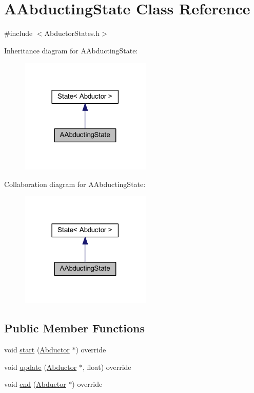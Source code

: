 \hypertarget{class_a_abducting_state}{}\section{A\+Abducting\+State Class Reference}
\label{class_a_abducting_state}


{\ttfamily \#include $<$Abductor\+States.\+h$>$}



Inheritance diagram for A\+Abducting\+State\+:
\nopagebreak
\begin{figure}[H]
\begin{center}
\leavevmode
\includegraphics[width=177pt]{class_a_abducting_state__inherit__graph}
\end{center}
\end{figure}


Collaboration diagram for A\+Abducting\+State\+:
\nopagebreak
\begin{figure}[H]
\begin{center}
\leavevmode
\includegraphics[width=177pt]{class_a_abducting_state__coll__graph}
\end{center}
\end{figure}
\subsection*{Public Member Functions}
\begin{DoxyCompactItemize}
\item 
void \hyperlink{class_a_abducting_state_a4a592efc0ae90b3c88de9cb676ed8357}{start} (\hyperlink{class_abductor}{Abductor} $\ast$) override
\item 
void \hyperlink{class_a_abducting_state_a37963b87c9c9fea8cfc8252618a53c98}{update} (\hyperlink{class_abductor}{Abductor} $\ast$, float) override
\item 
void \hyperlink{class_a_abducting_state_a618a6c11d2dc823b11161ff3a0c88ef8}{end} (\hyperlink{class_abductor}{Abductor} $\ast$) override
\end{DoxyCompactItemize}

